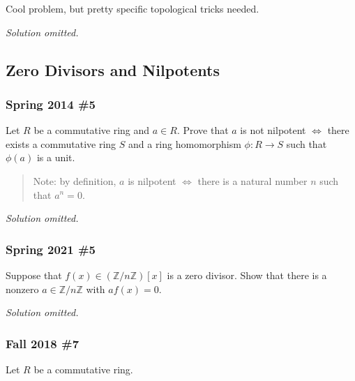 \begin{remark}

Cool problem, but pretty specific topological tricks needed.

\end{remark}

\emph{Solution omitted.}

\hypertarget{zero-divisors-and-nilpotents}{%
\subsection{Zero Divisors and
Nilpotents}\label{zero-divisors-and-nilpotents}}

\hypertarget{spring-2014-5}{%
\subsubsection{Spring 2014 \#5}\label{spring-2014-5}}

Let \(R\) be a commutative ring and \(a\in R\). Prove that \(a\) is not
nilpotent \(\iff\) there exists a commutative ring \(S\) and a ring
homomorphism \(\phi: R\to S\) such that \(\phi(a)\) is a unit.

\begin{quote}
Note: by definition, \(a\) is nilpotent \(\iff\) there is a natural
number \(n\) such that \(a^n = 0\).
\end{quote}

\emph{Solution omitted.}

\hypertarget{spring-2021-5}{%
\subsubsection{Spring 2021 \#5}\label{spring-2021-5}}

\begin{problem}[Spring 2021]

Suppose that \(f(x) \in ({\mathbb{Z}}/n{\mathbb{Z}})[x]\) is a zero
divisor. Show that there is a nonzero
\(a\in {\mathbb{Z}}/n{\mathbb{Z}}\) with \(af(x) = 0\).

\end{problem}

\emph{Solution omitted.}

\hypertarget{fall-2018-7}{%
\subsubsection{Fall 2018 \#7}\label{fall-2018-7}}

Let \(R\) be a commutative ring.

